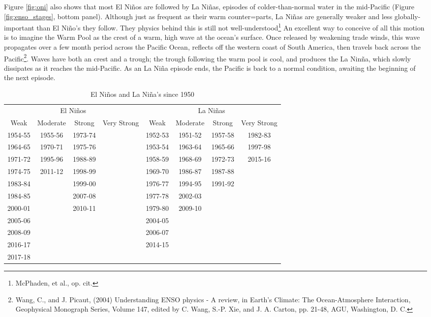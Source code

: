 {Figure \ref{fig:oni} also shows that most El Ni\~nos are followed by La Ni\~nas, episodes of colder-than-normal water in the mid-Pacific (Figure \ref{fig:enso_stages}, bottom panel). Although just as frequent as their warm counter=parts, La Ni\~nas are generally weaker and less globally-important than El Ni\~no's they follow. They physics behind this is still not well-understood\footnote{McPhaden, et al., op. cit.} An excellent way to conceive of all this motion is to imagine the Warm Pool as the crest of a warm, high wave at the ocean's surface. Once released by weakening trade winds, this wave propagates over a few month period across the Pacific Ocean, reflects off the western coast of South America, then travels back across the Pacific\footnote{Wang, C., and J. Picaut, (2004) Understanding ENSO physics - A review, in Earth's Climate: The Ocean-Atmosphere Interaction, Geophysical Monograph Series, Volume 147, edited by C. Wang, S.-P. Xie, and J. A. Carton, pp. 21-48, AGU, Washington, D. C.}. Waves have both an crest and a trough; the trough following the warm pool is cool, and produces the La Nin\~na, which slowly dissipates as it reaches the mid-Pacific. As an La Ni\~na episode ends, the Pacific is back to a normal condition, awaiting the beginning of the next episode.\\

\begin{table} 
\centering
\caption{El Ni\~nos and La Ni\~na's since 1950}
\label{tab:enso_occurences}
\begin{tabular}{@{}cccccccc@{}} \toprule
\multicolumn{4}{c}{El Ni\~nos} &\multicolumn{4}{c}{La Ni\~nas}\\ \cmidrule(r){1-4} \cmidrule(r){5-8}%
Weak		&Moderate	&Strong		&Very Strong	&Weak			&Moderate	&Strong		&Very Strong\\ \midrule
1954-55	&1955-56	&1973-74	&							&1952-53	&1951-52	&1957-58	&1982-83\\
1964-65	&1970-71	&1975-76	&							&1953-54	&1963-64	&1965-66	&1997-98\\
1971-72	&1995-96	&1988-89	&							&1958-59	&1968-69	&1972-73	&2015-16\\
1974-75	&2011-12	&1998-99	&							&1969-70	&1986-87	&1987-88\\
1983-84	&					&1999-00	&							&1976-77	&1994-95	&1991-92\\
1984-85	&					&2007-08	&							&1977-78	&2002-03	\\
2000-01	&					&2010-11	&							&1979-80	&2009-10	\\
2005-06	&					&					&							&2004-05	\\
2008-09	&					&					&							&2006-07\\
2016-17	&					&					&							&2014-15\\
2017-18\\ \bottomrule
\end{tabular}
\end{table}


}
